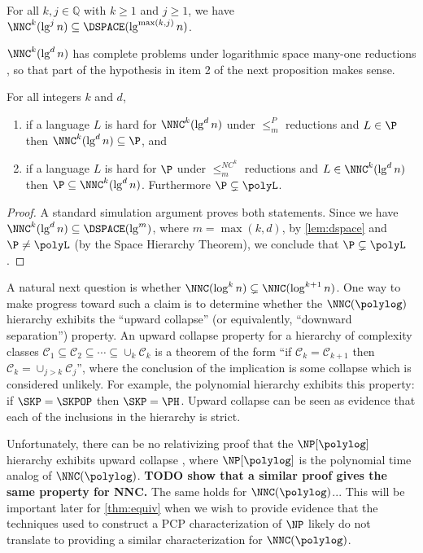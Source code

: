 \documentclass[]{article}
\begin{document}
\begin{lemma}\label{lem:dspace}
  For all $k, j \in \mathbb{Q}$ with $k \geq 1$ and $j \geq 1$, we have $\NNC^k(\lg^j n) \subseteq \DSPACE(\lg^{\max(k, j)} n)$.
\end{lemma}

$\NNC^k(\lg^d n)$ has complete problems under logarithmic space many-one reductions \cite[Theorem~3.6]{cc97}, so that part of the hypothesis in item 2 of the next proposition makes sense.

\begin{proposition}
  For all integers $k$ and $d$,
  \begin{enumerate}
  \item if a language $L$ is hard for $\NNC^k(\lg^d n)$ under $\leq_m^P$ reductions and $L \in \P$ then $\NNC^k(\lg^d n) \subseteq \P$, and
  \item if a language $L$ is hard for $\P$ under $\leq_m^{NC^k}$ reductions and $L \in \NNC^k(\lg^d n)$ then $\P \subseteq \NNC^k(\lg^d n)$.
    Furthermore $\P \subsetneq \polyL$.
  \end{enumerate}
\end{proposition}
\begin{proof}
  A standard simulation argument proves both statements.
  Since we have $\NNC^k(\lg^d n) \subseteq \DSPACE(\lg^m)$, where $m = \max(k, d)$, by \autoref{lem:dspace} and $\P \neq \polyL$ (by the Space Hierarchy Theorem), we conclude that $\P \subsetneq \polyL$.
\end{proof}

A natural next question is whether $\NNC(\log^k n) \subsetneq \NNC(\log^{k + 1} n)$.
One way to make progress toward such a claim is to determine whether the $\NNC(\polylog)$ hierarchy exhibits the ``upward collapse'' (or equivalently, ``downward separation'') property.
An upward collapse property for a hierarchy of complexity classes $\mathcal{C}_1 \subseteq \mathcal{C}_2 \subseteq \dotsb \subseteq \cup_k \mathcal{C}_k$ is a theorem of the form ``if $\mathcal{C}_k = \mathcal{C}_{k + 1}$ then $\mathcal{C}_k = \cup_{j > k} \mathcal{C}_j$'', where the conclusion of the implication is some collapse which is considered unlikely.
For example, the polynomial hierarchy exhibits this property: if $\SKP = \SKPOP$ then $\SKP = \PH$.
Upward collapse can be seen as evidence that each of the inclusions in the hierarchy is strict.

Unfortunately, there can be no relativizing proof that the $\NP[\polylog]$ hierarchy exhibits upward collapse \cite{bg94}, where $\NP[\polylog]$ is the polynomial time analog of $\NNC(\polylog)$.
\textbf{TODO show that a similar proof gives the same property for NNC.}
The same holds for $\NNC(\polylog)$...
This will be important later for \autoref{thm:equiv} when we wish to provide evidence that the techniques used to construct a PCP characterization of $\NP$ likely do not translate to providing a similar characterization for $\NNC(\polylog)$.
\end{document}
